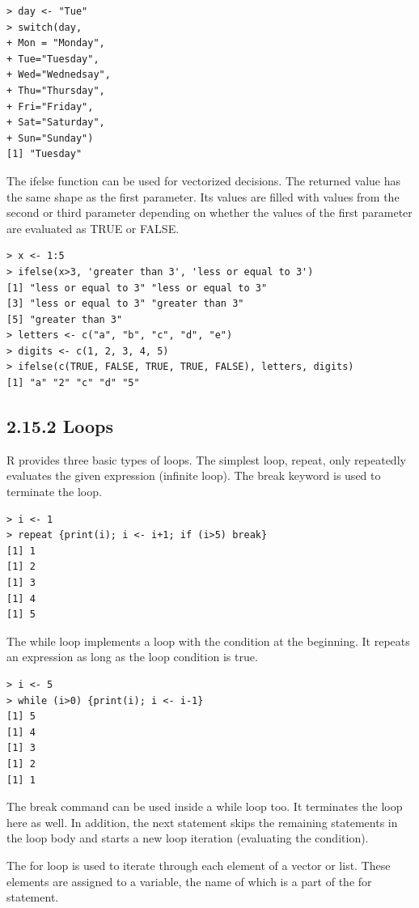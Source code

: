 \documentclass[10pt]{book}
\begin{document}
\begin{verbatim}
> day <- "Tue"
> switch(day,
+ Mon = "Monday",
+ Tue="Tuesday",
+ Wed="Wednedsay",
+ Thu="Thursday",
+ Fri="Friday",
+ Sat="Saturday",
+ Sun="Sunday")
[1] "Tuesday"
\end{verbatim}

The ifelse function can be used for vectorized decisions. The returned value has the same shape as the first parameter. Its values are filled with values from the second or third parameter depending on whether the values of the first parameter are evaluated as TRUE or FALSE.

\begin{verbatim}
> x <- 1:5
> ifelse(x>3, 'greater than 3', 'less or equal to 3')
[1] "less or equal to 3" "less or equal to 3"
[3] "less or equal to 3" "greater than 3"
[5] "greater than 3"
> letters <- c("a", "b", "c", "d", "e")
> digits <- c(1, 2, 3, 4, 5)
> ifelse(c(TRUE, FALSE, TRUE, TRUE, FALSE), letters, digits)
[1] "a" "2" "c" "d" "5"
\end{verbatim}

\subsection*{2.15.2 Loops}
R provides three basic types of loops. The simplest loop, repeat, only repeatedly evaluates the given expression (infinite loop). The break keyword is used to terminate the loop.

\begin{verbatim}
> i <- 1
> repeat {print(i); i <- i+1; if (i>5) break}
[1] 1
[1] 2
[1] 3
[1] 4
[1] 5
\end{verbatim}

The while loop implements a loop with the condition at the beginning. It repeats an expression as long as the loop condition is true.

\begin{verbatim}
> i <- 5
> while (i>0) {print(i); i <- i-1}
[1] 5
[1] 4
[1] 3
[1] 2
[1] 1
\end{verbatim}

The break command can be used inside a while loop too. It terminates the loop here as well. In addition, the next statement skips the remaining statements in the loop body and starts a new loop iteration (evaluating the condition).

The for loop is used to iterate through each element of a vector or list. These elements are assigned to a variable, the name of which is a part of the for statement.
\end{document}
